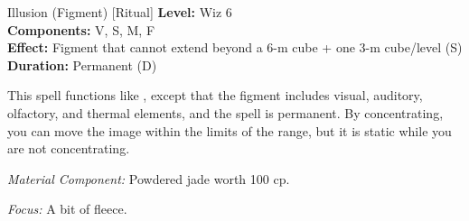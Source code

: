 {Illusion (Figment) [Ritual]}
{
	\textbf{Level:}
	Wiz 6\\
	\textbf{Components:}
	V, S, M, F\\
	\textbf{Effect:}
	Figment that cannot extend beyond a 6-m cube + one 3-m cube/level (S)\\
	\textbf{Duration:}
	Permanent (D)\\
}
{
	This spell functions like , except that the figment includes visual, auditory, olfactory, and thermal elements, and the spell is permanent. By concentrating, you can move the image within the limits of the range, but it is static while you are not concentrating.

	\textit{Material Component:}
	 Powdered jade worth 100 cp.

	\textit{Focus:}
	A bit of fleece.

}

